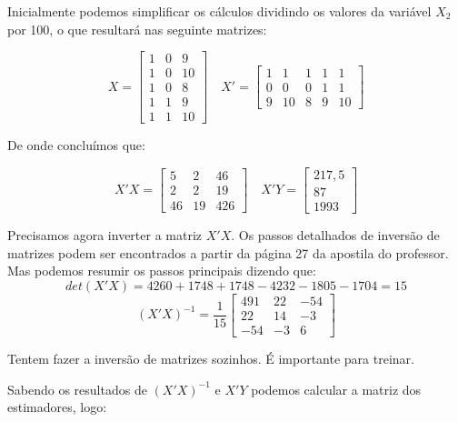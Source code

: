 \documentclass[]{ufpe-exercises}
\begin{document}
\begin{questions}
\begin{parts}
\begin{solution}
			Inicialmente podemos simplificar os cálculos dividindo os valores da variável \(X_2\) por 100, o que resultará nas seguinte matrizes:

			\[
				X =
				\begin{bmatrix}
					1 & 0 & 9  \\
					1 & 0 & 10 \\
					1 & 0 & 8  \\
					1 & 1 & 9  \\
					1 & 1 & 10
				\end{bmatrix} \quad
				X' =
				\begin{bmatrix}
					1 & 1  & 1 & 1 & 1  \\
					0 & 0  & 0 & 1 & 1  \\
					9 & 10 & 8 & 9 & 10
				\end{bmatrix}
			\]

			De onde concluímos que:

			\[
				X'X =
				\begin{bmatrix}
					5  & 2  & 46  \\
					2  & 2  & 19  \\
					46 & 19 & 426
				\end{bmatrix} \quad
				X'Y =
				\begin{bmatrix}
					217,5 \\
					87    \\
					1993
				\end{bmatrix}
			\]

			Precisamos agora inverter a matriz \(X'X\). Os passos detalhados de inversão de matrizes podem ser encontrados a partir da página 27 da apostila do professor. Mas podemos resumir os passos principais dizendo que:
			\[
				\textit{det}(X'X) = 4260 + 1748 + 1748 - 4232 - 1805 - 1704 = 15
			\]
			\[
				(X'X)^{-1} = \frac{1}{15}
				\begin{bmatrix}
					491 & 22 & -54 \\
					22  & 14 & -3  \\
					-54 & -3 & 6
				\end{bmatrix}
			\]

			\begin{tcolorbox}[colback=red!5!white,colframe=red!75!black,title=Atenção]
				Tentem fazer a inversão de matrizes sozinhos. É importante para treinar.
			\end{tcolorbox}

			Sabendo os resultados de \((X'X)^{-1}\) e \(X'Y\) podemos calcular a matriz dos estimadores, logo:


\end{solution}
\end{parts}
\end{questions}
\end{document}
